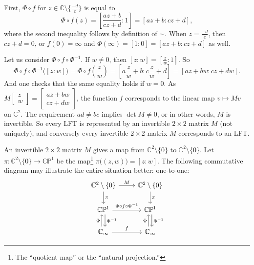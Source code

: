 \documentclass[12pt,openany]{book}
\newcommand{\C}{{\mathbb{C}}}
\newcommand{\bP}{{\mathbb{P}}}
\theoremstyle{plain}
\theoremstyle{remark}
\theoremstyle{definition}
\theoremstyle{exercise}
\theoremstyle{example}
\begin{document}
First, $\Phi \circ f$ for $z \in \C \setminus \bigl\{ \frac{-d}{c} \bigr\}$
is equal to
\begin{equation*}
\Phi \circ f(z) =
\left[\frac{a z + b}{c z + d}: 1 \right]
=
\left[a z + b: c z + d \right] ,
\end{equation*}
where the second inequality follows by definition of $\sim$.
When $z = \frac{-d}{c}$, then $cz+d = 0$, or $f(0) = \infty$
and $\Phi(\infty) = [1:0] = [az+b : cz+d]$ as well.

Let us consider $\Phi \circ f \circ \Phi^{-1}$.
If $w \not= 0$, then $[z:w] = \left[ \frac{z}{w}:1 \right]$.  So
\begin{equation*}
\Phi \circ f \circ \Phi^{-1} \bigl([z:w]\bigr) =
\Phi \circ f \left(\frac{z}{w}\right) =
\left[a \frac{z}{w} + b : c \frac{z}{w} + d \right] =
\left[a z + b w: c z + d w \right] .
\end{equation*}
And one checks that the same equality holds if $w=0$.
As
$M \left[ \begin{smallmatrix} z \\ w \end{smallmatrix} \right]
= \left[ \begin{smallmatrix} 
a z + b w \\ c z + d w
\end{smallmatrix} \right]$,
the function $f$ corresponds to the linear map $v \mapsto Mv$ on $\C^2$.
The requirement $ad \not= bc$ implies $\det M \not= 0$,
or in other words, $M$ is invertible.
So every LFT is represented by an invertible $2 \times 2$ matrix $M$
(not uniquely), and
conversely every invertible $2 \times 2$ matrix $M$ corresponds to an LFT.

An invertible $2 \times 2$ matrix $M$ gives a map from
$\C^2 \setminus \{ 0 \}$ to $\C^2 \setminus \{ 0 \}$.
Let $\pi \colon \C^2 \setminus \{ 0 \} \to \C \bP^1$ be the map\footnote{The
``quotient map'' or the ``natural projection.''}
$\pi \bigl( (z,w) \bigr) =
[z:w]$.  The following commutative diagram may
illustrate the entire situation better:
one-to-one:
\begin{equation*}
\begin{tikzcd}
\C^2 \setminus \{ 0 \} \arrow[r,"M"] \arrow[d,"\pi"] &
\C^2 \setminus \{ 0 \} \arrow[d,"\pi"] \\
\C \bP^1 \arrow[r,"\Phi \circ f \circ \Phi^{-1}"] \arrow[d,shift left,"\Phi^{-1}"] &
\C \bP^1 \arrow[d,shift left,"\Phi^{-1}"]
\\
\C_\infty \arrow[r,"f"]\arrow[u,shift left,"\Phi"] &
\C_\infty \arrow[u,shift left,"\Phi"]
\end{tikzcd}
\end{equation*}
\end{document}
